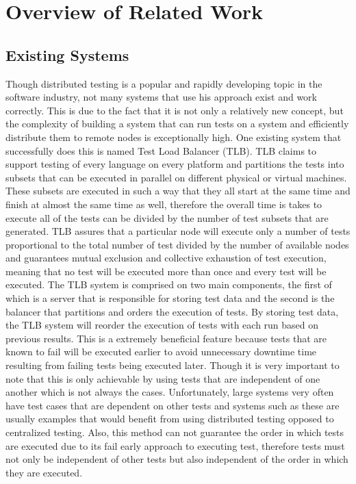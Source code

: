 \documentclass{article}
\begin{document}
{\section{Overview of Related Work}
\subsection{Existing Systems}

Though distributed testing is a popular and rapidly developing topic in the software industry, not many systems that use his approach exist and work correctly. This is due to the fact that it is not only a relatively new concept, but the complexity of building a system that can run tests on a system and efficiently distribute them to remote nodes is exceptionally high. One existing system that successfully does this is named Test Load Balancer (TLB). TLB claims to support testing of every language on every platform and partitions the tests into subsets that can be executed in parallel on different physical or virtual machines. These subsets are executed in such a way that they all start at the same time and finish at almost the same time as well, therefore the overall time is takes to execute all of the tests can be divided by the number of test subsets that are generated. TLB assures that a particular node will execute only a number of tests proportional to the total number of test divided by the number of available nodes and guarantees mutual exclusion and collective exhaustion of test execution, meaning that no test will be executed more than once and every test will be executed. The TLB system is comprised on two main components, the first of which is a server that is responsible for storing test data and the second is the balancer that partitions and orders the execution of tests. By storing test data, the TLB system will reorder the execution of tests with each run based on previous results. This is a extremely beneficial feature because tests that are known to fail will be executed earlier to avoid unnecessary downtime time resulting from failing tests being executed later. Though it is very important to note that this is only achievable by using tests that are independent of one another which is not always the cases. Unfortunately, large systems very often have test cases that are dependent on other tests and systems such as these are usually examples that would benefit from using distributed testing opposed to centralized testing. Also, this method can not guarantee the order in which tests are executed due to its fail early approach to executing test, therefore tests must not only be independent of other tests but also independent of the order in which they are executed.

}
\end{document}
